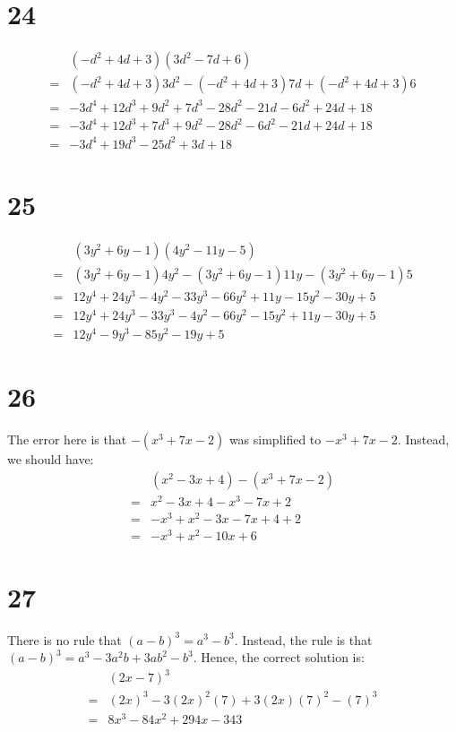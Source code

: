 \documentclass{article}
\theoremstyle{definition}
\begin{document}
\section*{24}
\[
\begin{array}{rl}
	& (-d^2+4d+3)(3d^2-7d+6) \\
=	& (-d^2+4d+3)3d^2-(-d^2+4d+3)7d+(-d^2+4d+3)6 \\
=	& -3d^4+12d^3+9d^2+7d^3-28d^2-21d-6d^2+24d+18 \\
=	& -3d^4+12d^3+7d^3+9d^2-28d^2-6d^2-21d+24d+18 \\
=	& -3d^4+19d^3-25d^2+3d+18
\end{array}
\]

\section*{25}
\[
\begin{array}{rl}
	& (3y^2+6y-1)(4y^2-11y-5) \\
=	& (3y^2+6y-1)4y^2-(3y^2+6y-1)11y-(3y^2+6y-1)5 \\
=	& 12y^4+24y^3-4y^2-33y^3-66y^2+11y-15y^2-30y+5 \\
=	& 12y^4+24y^3-33y^3-4y^2-66y^2-15y^2+11y-30y+5 \\
=	& 12y^4-9y^3-85y^2-19y+5
\end{array}
\]

\section*{26}
The error here is that $-(x^3+7x-2)$ was simplified to $-x^3+7x-2$. Instead, we should have:
\[
\begin{array}{rl}
	& (x^2-3x+4)-(x^3+7x-2) \\
=	& x^2-3x+4-x^3-7x+2 \\
=	& -x^3+x^2-3x-7x+4+2 \\
=	& -x^3+x^2-10x+6
\end{array}
\]

\section*{27}
There is no rule that $(a-b)^3=a^3-b^3$. Instead, the rule is that $(a-b)^3=a^3-3a^2b+3ab^2-b^3$. Hence, the correct solution is:
\[
\begin{array}{rl}
	& (2x-7)^3 \\
=	& (2x)^3-3(2x)^2(7)+3(2x)(7)^2-(7)^3 \\
=	& 8x^3-84x^2+294x-343 \\
\end{array}
\]
\end{document}
